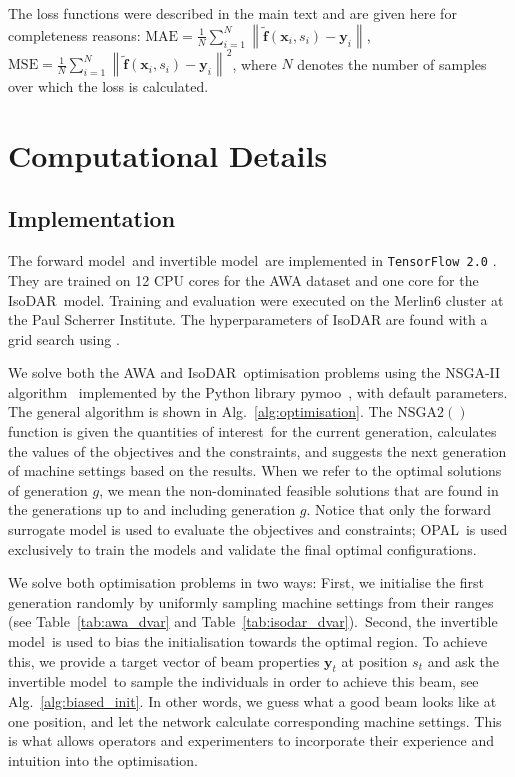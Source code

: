 \documentclass[a4paper, 12pt, version-1-compatibility]{article}
\def\forwardmodel{forward model}
\def\invertiblemodel{invertible model}
\def\isodar{IsoDAR}
\def\opal{OPAL}
\def\qois{quantities of interest}
\newcommand{\tabref}[1]{Table~\ref{#1}}
\newcommand{\myvec}[1]{\mathbf{#1}}
\begin{document}
The loss functions were described in the main text and are given here for completeness reasons: $\mathrm{MAE} = \frac{1}{N} \sum_{i=1}^N \left\lVert \myvec{\tilde{f}}(\myvec{x}_i, s_i) - \myvec{y}_i \right\rVert$, $\mathrm{MSE} = \frac{1}{N} \sum_{i=1}^N \left\lVert \myvec{\tilde{f}}(\myvec{x}_i, s_i) - \myvec{y}_i \right\rVert^2$, where $N$ denotes the number of samples over which the loss is calculated.
\clearpage

\section{Computational Details}
\label{sec:speedup}
\subsection*{Implementation}
The \forwardmodel\ and \invertiblemodel\ are implemented in \texttt{TensorFlow 2.0} \cite{tensorflow2015-whitepaper}. They are trained on 12 CPU cores for the AWA dataset and one core for the \isodar\ model. Training and evaluation were executed on the Merlin6 cluster at the Paul Scherrer Institute.
The hyperparameters of IsoDAR are found with a grid search using \cite{liaw2018tune}. 

We solve both the AWA and \isodar\ optimisation problems using the NSGA-II algorithm~\cite{nsga2} implemented by the Python library pymoo~\cite{pymoo}, with default parameters. The general algorithm is shown in Alg.~\ref{alg:optimisation}. The $\mathrm{NSGA2}()$ function is given the \qois\ for the current generation, calculates the values of the objectives and the constraints, and suggests the next generation of machine settings based on the results. When we refer to the optimal solutions of generation $g$, we mean the non-dominated feasible solutions that are found in the generations up to and including generation $g$. Notice that only the forward surrogate model is used to evaluate the objectives and constraints; \opal\ is used exclusively to train the models and validate the final optimal configurations.

We solve both optimisation problems in two ways: First, we initialise the first generation randomly by uniformly sampling machine settings from their ranges (see \tabref{tab:awa_dvar} and \tabref{tab:isodar_dvar}).\
 Second, the \invertiblemodel\ is used to bias the initialisation towards the optimal region. To achieve this, we provide a target vector of beam properties $\myvec{y}_t$ at position $s_t$ and ask the \invertiblemodel\ to sample the individuals in order to achieve this beam, see Alg.~\ref{alg:biased_init}. In other words, we guess what a good beam looks like at one position, and let the network calculate corresponding machine settings. This is what allows operators and experimenters to incorporate their experience and intuition into the optimisation.
 
\end{document}
